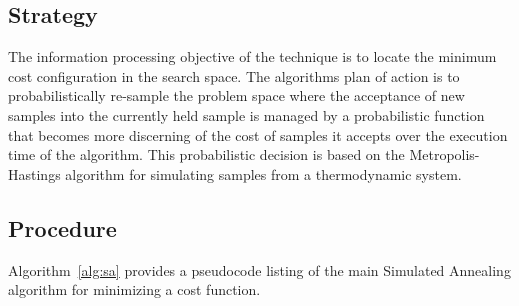 \subsection{Strategy}
The information processing objective of the technique is to locate the minimum cost configuration in the search space.
The algorithms plan of action is to probabilistically re-sample the problem space where the acceptance of new samples into the currently held sample is managed by a probabilistic function that becomes more discerning of the cost of samples it accepts over the execution time of the algorithm. This probabilistic decision is based on the Metropolis-Hastings algorithm for simulating samples from a thermodynamic system.

\subsection{Procedure}
Algorithm~\ref{alg:sa} provides a pseudocode listing of the main Simulated Annealing algorithm for minimizing a cost function.

